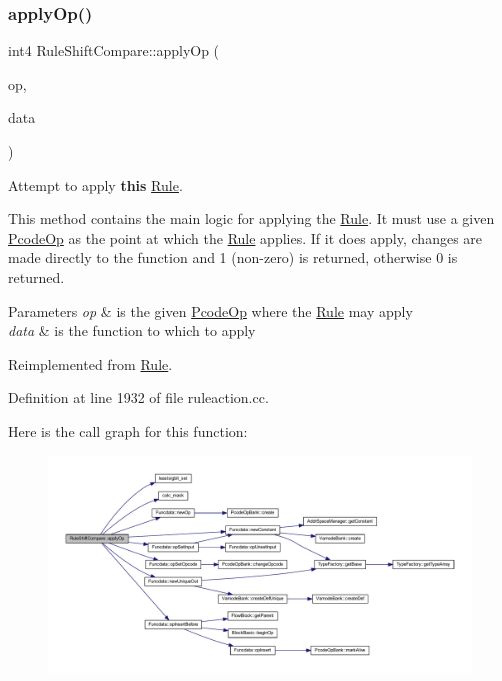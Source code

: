 \subsubsection{\texorpdfstring{applyOp()}{applyOp()}}
{\footnotesize\ttfamily int4 Rule\+Shift\+Compare\+::apply\+Op (\begin{DoxyParamCaption}\item[{\mbox{\hyperlink{class_pcode_op}{Pcode\+Op}} $\ast$}]{op,  }\item[{\mbox{\hyperlink{class_funcdata}{Funcdata}} \&}]{data }\end{DoxyParamCaption})\hspace{0.3cm}{\ttfamily [virtual]}}



Attempt to apply {\bfseries{this}} \mbox{\hyperlink{class_rule}{Rule}}. 

This method contains the main logic for applying the \mbox{\hyperlink{class_rule}{Rule}}. It must use a given \mbox{\hyperlink{class_pcode_op}{Pcode\+Op}} as the point at which the \mbox{\hyperlink{class_rule}{Rule}} applies. If it does apply, changes are made directly to the function and 1 (non-\/zero) is returned, otherwise 0 is returned. 
\begin{DoxyParams}{Parameters}
{\em op} & is the given \mbox{\hyperlink{class_pcode_op}{Pcode\+Op}} where the \mbox{\hyperlink{class_rule}{Rule}} may apply \\
\hline
{\em data} & is the function to which to apply \\
\hline
\end{DoxyParams}


Reimplemented from \mbox{\hyperlink{class_rule_a4e3e61f066670175009f60fb9dc60848}{Rule}}.



Definition at line 1932 of file ruleaction.\+cc.

Here is the call graph for this function\+:
\nopagebreak
\begin{figure}[H]
\begin{center}
\leavevmode
\includegraphics[width=350pt]{class_rule_shift_compare_a8104a2a2506b0a63aeba91f4a9d505ba_cgraph}
\end{center}
\end{figure}
\mbox{\label{class_rule_shift_compare_aea9f8ff6217f01e880ae5c3fd4370837}} 
